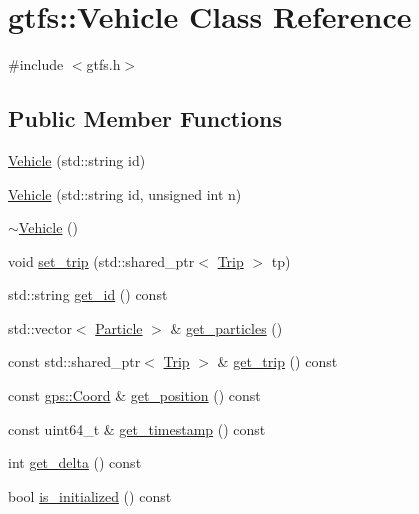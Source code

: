 \hypertarget{classgtfs_1_1Vehicle}{}\section{gtfs\+:\+:Vehicle Class Reference}
\label{classgtfs_1_1Vehicle}


{\ttfamily \#include $<$gtfs.\+h$>$}

\subsection*{Public Member Functions}
\begin{DoxyCompactItemize}
\item 
\hyperlink{classgtfs_1_1Vehicle_ac3f8111a611378f5f8b29f7465e48919}{Vehicle} (std\+::string id)
\item 
\hyperlink{classgtfs_1_1Vehicle_adf892e71483b7f9005846599fd0308e6}{Vehicle} (std\+::string id, unsigned int n)
\item 
\hyperlink{classgtfs_1_1Vehicle_a08c7450dd0df9406f78b30be044d27d8}{$\sim$\+Vehicle} ()
\item 
void \hyperlink{classgtfs_1_1Vehicle_a47ceaf4bb31c01dd4b26a12f1b7b7089}{set\+\_\+trip} (std\+::shared\+\_\+ptr$<$ \hyperlink{classgtfs_1_1Trip}{Trip} $>$ tp)
\item 
std\+::string \hyperlink{classgtfs_1_1Vehicle_a1586a271d8c8d7eb61f6f1fac5491e26}{get\+\_\+id} () const 
\item 
std\+::vector$<$ \hyperlink{classgtfs_1_1Particle}{Particle} $>$ \& \hyperlink{classgtfs_1_1Vehicle_a7b12b079c68880f00f532ca25858c368}{get\+\_\+particles} ()
\item 
const std\+::shared\+\_\+ptr$<$ \hyperlink{classgtfs_1_1Trip}{Trip} $>$ \& \hyperlink{classgtfs_1_1Vehicle_a347033bb5e55c8af3abdb68b1a13462a}{get\+\_\+trip} () const 
\item 
const \hyperlink{classgps_1_1Coord}{gps\+::\+Coord} \& \hyperlink{classgtfs_1_1Vehicle_a30f091d1b875adbef1423e9dbedbab4e}{get\+\_\+position} () const 
\item 
const uint64\+\_\+t \& \hyperlink{classgtfs_1_1Vehicle_acb6df64b36b7fa25132ff97c2a1e434d}{get\+\_\+timestamp} () const 
\item 
int \hyperlink{classgtfs_1_1Vehicle_ad273d29ef8020e572bfc978bf39775a4}{get\+\_\+delta} () const 
\item 
bool \hyperlink{classgtfs_1_1Vehicle_a0224421a07ed4b2f8ce68dd337a772ad}{is\+\_\+initialized} () const 
\item 

\end{DoxyCompactItemize}
